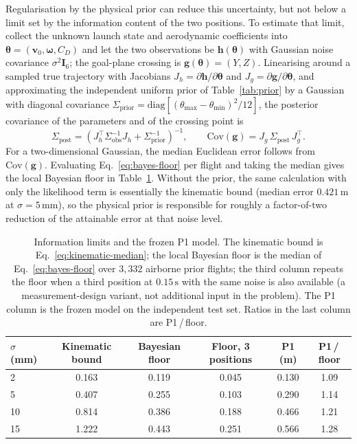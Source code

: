 \documentclass[11pt,a4paper]{article}
\begin{document}
Regularisation by the physical prior can reduce this uncertainty, but not below a
limit set by the information content of the two positions.  To estimate that
limit, collect the unknown launch state and aerodynamic coefficients into
$\boldsymbol{\theta}=(\mathbf{v}_0,\boldsymbol{\omega},C_D)$ and let the two
observations be $\mathbf{h}(\boldsymbol{\theta})$ with Gaussian noise covariance
$\sigma^2\mathbf{I}_6$; the goal-plane crossing is
$\mathbf{g}(\boldsymbol{\theta})=(Y,Z)$.  Linearising around a sampled true
trajectory with Jacobians $J_h=\partial\mathbf{h}/\partial\boldsymbol{\theta}$ and
$J_g=\partial\mathbf{g}/\partial\boldsymbol{\theta}$, and approximating the
independent uniform prior of Table~\ref{tab:prior} by a Gaussian with diagonal
covariance $\Sigma_{\mathrm{prior}}=\mathrm{diag}\left[(\theta_{\max}-\theta_{\min})^2/12\right]$,
the posterior covariance of the parameters and of the crossing point is
\begin{equation}
  \Sigma_{\mathrm{post}}
  =\left(J_h^{\!\top}\Sigma_{\mathrm{obs}}^{-1}J_h
  +\Sigma_{\mathrm{prior}}^{-1}\right)^{-1},
  \qquad
  \mathrm{Cov}(\mathbf{g})=J_g\,\Sigma_{\mathrm{post}}\,J_g^{\!\top}.
  \label{eq:bayes-floor}
\end{equation}
For a two-dimensional Gaussian, the median Euclidean error follows from
$\mathrm{Cov}(\mathbf{g})$.  Evaluating Eq.~\eqref{eq:bayes-floor} per flight and
taking the median gives the local Bayesian floor in Table~\ref{tab:info-floor}.
Without the prior, the same calculation with only the likelihood term is
essentially the kinematic bound (median error $0.421\,\mathrm{m}$ at
$\sigma=5\,\mathrm{mm}$), so the physical prior is responsible for roughly a
factor-of-two reduction of the attainable error at that noise level.

\begin{table}[htbp]
  \centering
  \caption{Information limits and the frozen P1 model. The kinematic bound is
  Eq.~\eqref{eq:kinematic-median}; the local Bayesian floor is the median of
  Eq.~\eqref{eq:bayes-floor} over $3{,}332$ airborne prior flights; the third
  column repeats the floor when a third position at $0.15\,\mathrm{s}$ with the
  same noise is also available (a measurement-design variant, not additional
  input in the problem). The P1 column is the frozen model on the independent
  test set. Ratios in the last column are P1\,/\,floor.}
  \label{tab:info-floor}
  \begin{tabular}{lccccc}
    \toprule
    $\sigma$ (mm) & Kinematic bound & Bayesian floor & Floor, 3 positions & P1 (m) & P1\,/\,floor \\
    \midrule
    2  & 0.163 & 0.119 & 0.045 & 0.130 & 1.09 \\
    5  & 0.407 & 0.255 & 0.103 & 0.290 & 1.14 \\
    10 & 0.814 & 0.386 & 0.188 & 0.466 & 1.21 \\
    15 & 1.222 & 0.443 & 0.251 & 0.566 & 1.28 \\
    \bottomrule
  \end{tabular}
\end{table}
\end{document}
